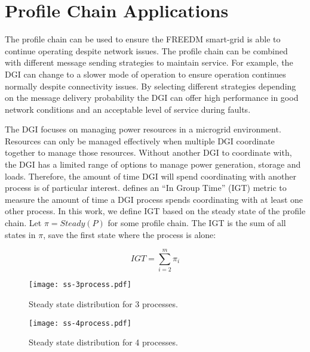
\section{Profile Chain Applications}

The profile chain can be used to ensure the FREEDM smart-grid is able to continue operating despite network issues.
The profile chain can be combined with different message sending strategies to maintain service.
For example, the DGI can change to a slower mode of operation to ensure operation continues normally despite connectivity issues.
By selecting different strategies depending on the message delivery probability the DGI can offer high performance in good network conditions and an acceptable level of service during faults.

The DGI focuses on managing power resources in a microgrid environment.
Resources can only be managed effectively when multiple DGI coordinate together to manage those resources.
Without another DGI to coordinate with, the DGI has a limited range of options to manage power generation, storage and loads.
Therefore, the amount of time DGI will spend coordinating with another process is of particular interest.
\cite{CRITIS2012} defines an ``In Group Time'' (IGT) metric to measure the amount of time a DGI process spends coordinating with at least one other process.
In this work, we define IGT based on the steady state of the profile chain.
Let $\pi=Steady(P)$ for some profile chain.
The IGT is the sum of all states in $\pi$, save the first state where the process is alone:

\[ IGT = \sum_{i=2}^{m} \pi_i \]

\begin{figure}
    \centering
    \texttt{[image: ss-3process.pdf]}
    \caption{Steady state distribution for 3 processes.}
    \label{fig:ss-3process}
\end{figure}

\begin{figure}
    \centering
    \texttt{[image: ss-4process.pdf]}
    \caption{Steady state distribution for 4 processes.}
    \label{fig:ss-4process}
\end{figure}

